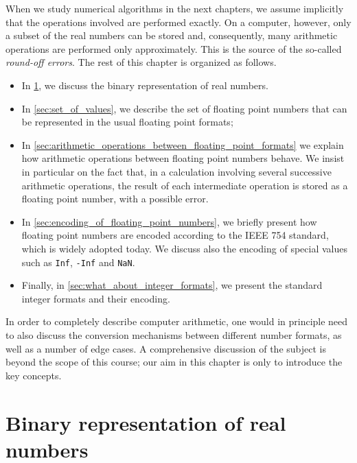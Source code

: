 When we study numerical algorithms in the next chapters,
we assume implicitly that the operations involved are performed exactly.
On a computer, however, only a subset of the real numbers can be stored and,
consequently, many arithmetic operations are performed only approximately.
This is the source of the so-called \emph{round-off errors}.
The rest of this chapter is organized as follows.
\begin{itemize}
    \item
        In \cref{sec:binary_representation_of_real_numbers},
        we discuss the binary representation of real numbers.

    \item
        In \cref{sec:set_of_values},
        we describe the set of floating point numbers that can be represented in the usual floating point formats;

    \item
        In \cref{sec:arithmetic_operations_between_floating_point_formats}
        we explain how arithmetic operations between floating point numbers behave.
        We insist in particular on the fact that,
        in a calculation involving several successive arithmetic operations,
        the result of each intermediate operation is stored as a floating point number,
        with a possible error.

    \item
        In \cref{sec:encoding_of_floating_point_numbers},
        we briefly present how floating point numbers are encoded
        according to the IEEE 754 standard, which is widely adopted today.
        We discuss also the encoding of special values such as \texttt{Inf}, \texttt{-Inf} and \texttt{NaN}.

    \item
        Finally, in \cref{sec:what_about_integer_formats},
        we present the standard integer formats and their encoding.
\end{itemize}
In order to completely describe computer arithmetic,
one would in principle need to also discuss the conversion mechanisms between different number formats,
as well as a number of edge cases.
A comprehensive discussion of the subject is beyond the scope of this course;
our aim in this chapter is only to introduce the key concepts.

\section{Binary representation of real numbers}%
\label{sec:binary_representation_of_real_numbers}

